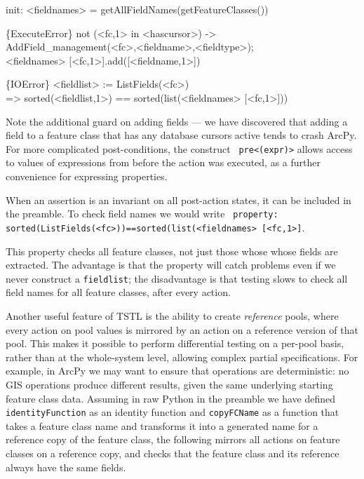 {\scriptsize
\begin{code}
init: <fieldnames> = getAllFieldNames(getFeatureClasses())

\{ExecuteError\} not (<fc,1> in <hascursor>) -> \\
   AddField\_management(<fc>,<fieldname>,<fieldtype>); \\
   <fieldnames> [<fc,1>].add([<fieldname,1>])

\{IOError\} <fieldlist> := ListFields(<fc>) \\
  => sorted(<fieldlist,1>) == sorted(list(<fieldnames> [<fc,1>]))
\end{code}
}

Note the additional guard on adding fields --- we have discovered that
adding a field to a feature class that has any database cursors active
tends to crash ArcPy.  For more complicated post-conditions, the construct {\tt
  pre<(expr)>} allows access to values of expressions from before the
action was executed, as a further convenience for expressing properties.

When an assertion is an invariant on all post-action states, it can be
included in the preamble.  To check field names we would write {\tt
  property: sorted(ListFields(<fc>))==sorted(list(<fieldnames>
  [<fc,1>]}.

This property checks all feature classes, not just those whose
whose fields are extracted.  The advantage is that the property will
catch problems even if we never construct a {\tt fieldlist}; the
disadvantage is that testing slows to check all field names for all
feature classes, after every action.

Another useful feature of TSTL is the ability to create
\emph{reference} pools, where every action on pool values is mirrored
by an action on a reference version of that pool.  This makes it
possible to perform differential testing \cite{Differential} on a
per-pool basis, rather than at the whole-system level, allowing
complex partial specifications.  For example, in ArcPy we may want to
ensure that operations are deterministic: no GIS operations produce
different results, given the same underlying starting feature class
data.  Assuming in raw Python in the preamble we have defined {\tt
  identityFunction} as an identity function and {\tt copyFCName} as a
function that takes a feature class name and transforms it into a
generated name for a reference copy of the feature class, the
following mirrors all actions on feature classes on a reference copy,
and checks that the feature class and its reference always have the
same fields.

